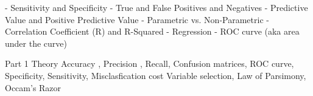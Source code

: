- Sensitivity and Specificity
- True and False Positives and Negatives
- Predictive Value and Positive Predictive Value
- Parametric vs. Non-Parametric
- Correlation Coefficient (R) and R-Squared
- Regression
- ROC curve (aka area under the curve)

Part 1 Theory 
Accuracy , Precision , Recall, Confusion matrices, ROC curve, Specificity, Sensitivity, Misclasfication cost
Variable selection, Law of Parsimony, Occam's Razor






























